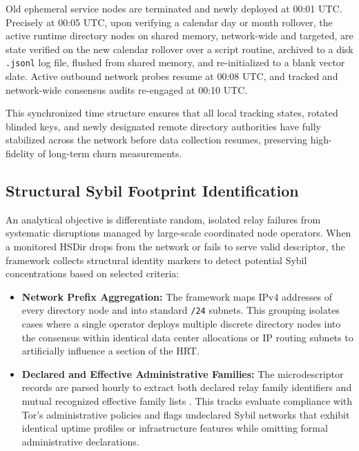 \documentclass[conference]{IEEEtran}
\begin{document}
Old ephemeral service nodes are terminated and newly deployed at 00:01 UTC. Precisely at 00:05 UTC, upon verifying a calendar day or month rollover, the active runtime directory nodes on 
shared memory, network-wide and targeted, are state verified on the new calendar rollover over a script routine, archived to a disk \texttt{.jsonl} log file, flushed from shared memory, and
re-initialized to a blank vector slate. Active outbound network probes resume at 00:08 UTC, and tracked and network-wide consensus audits re-engaged at 00:10 UTC. 

This synchronized time structure ensures that all local tracking states, rotated blinded keys, and newly designated remote directory authorities have fully stabilized across the network 
before data collection resumes, preserving high-fidelity of long-term churn measurements.

\subsection{Structural Sybil Footprint Identification}\label{subsec:sybil-footprint}

An analytical objective is differentiate random, isolated relay failures from systematic disruptions managed by large-scale coordinated node operators. When a monitored HSDir drops from the network
or fails to serve valid descriptor, the framework collects structural identity markers to detect potential Sybil concentrations based on selected criteria:

\begin{itemize}
    \item \textbf{Network Prefix Aggregation:} The framework maps IPv4 addresses of every directory node  and into standard \texttt{/24} subnets. This grouping isolates cases where a single operator deploys multiple discrete directory nodes into the consensus within identical data center allocations or IP routing subnets to artificially influence a section of the HRT.
    \item \textbf{Declared and Effective Administrative Families:} The microdescriptor records are parsed hourly to extract both declared relay family identifiers and mutual recognized effective family lists \cite{tor_dirspec}. This tracks evaluate compliance with Tor's administrative policies and flags undeclared Sybil networks that exhibit identical uptime profiles or infrastructure features while omitting formal administrative declarations.
\end{itemize}
\end{document}
